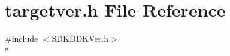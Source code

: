 \section{targetver.\+h File Reference}
\label{targetver_8h}
{\ttfamily \#include $<$S\+D\+K\+D\+D\+K\+Ver.\+h$>$}\\*
